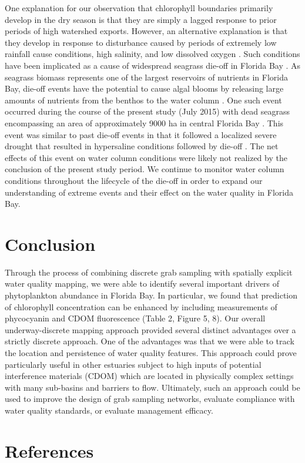 \documentclass[review]{elsarticle}
\begin{document}
One explanation for our observation that chlorophyll boundaries primarily develop in the dry season is that they are simply a lagged response to prior periods of high watershed exports. However, an alternative explanation is that they develop in response to disturbance caused by periods of extremely low rainfall cause conditions, high salinity, and low dissolved oxygen \citep{hall2016recurrence}. Such conditions have been implicated as a cause of widespread seagrass die-off in Florida Bay \citep{borum2005potential, zieman1999seagrass}. As seagrass biomass represents one of the largest reservoirs of nutrients in Florida Bay, die-off events have the potential to cause algal blooms by releasing large amounts of nutrients from the benthos to the water column \citep{fourqurean2012carbon, zhang2004potential}. One such event occurred during the course of the present study (July 2015) with dead seagrass encompassing an area of approximately 9000 ha in central Florida Bay \citep{hall2016recurrence}. This event was similar to past die-off events in that it followed a localized severe drought that resulted in hypersaline conditions followed by die-off \citep[Figure 4;][]{robblee1991mass}. The net effects of this event on water column conditions were likely not realized by the conclusion of the present study period. We continue to monitor water column conditions throughout the lifecycle of the die-off in order to expand our understanding of extreme events and their effect on the water quality in Florida Bay.

\section{Conclusion}

Through the process of combining discrete grab sampling with spatially explicit water quality mapping, we were able to identify several important drivers of phytoplankton abundance in Florida Bay. In particular, we found that prediction of chlorophyll concentration can be enhanced by including measurements of phycocyanin and CDOM fluorescence (Table 2, Figure 5, 8). Our overall underway-discrete mapping approach provided several distinct advantages over a strictly discrete approach. One of the advantages was that we were able to track the location and persistence of water quality features. This approach could prove particularly useful in other estuaries subject to high inputs of potential interference materials (CDOM) which are located in physically complex settings with many sub-basins and barriers to flow. Ultimately, such an approach could be used to improve the design of grab sampling networks, evaluate compliance with water quality standards, or evaluate management efficacy.

\section*{References}


\end{document}
